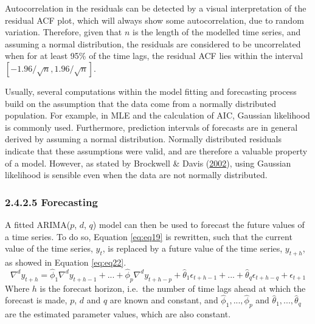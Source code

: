 \documentclass[12pt,oneside]{reedthesis}
\begin{document}
Autocorrelation in the residuals can be detected by a visual
interpretation of the residual ACF plot, which will always show some
autocorrelation, due to random variation. Therefore, given that \(n\) is
the length of the modelled time series, and assuming a normal
distribution, the residuals are considered to be uncorrelated when for
at least 95\% of the time lags, the residual ACF lies within the
interval \([-1.96/\sqrt{n}, 1.96/\sqrt{n}]\).

Usually, several computations within the model fitting and forecasting
process build on the assumption that the data come from a normally
distributed population. For example, in MLE and the calculation of AIC,
Gaussian likelihood is commonly used. Furthermore, prediction intervals
of forecasts are in general derived by assuming a normal distribution.
Normally distributed residuals indicate that these assumptions were
valid, and are therefore a valuable property of a model. However, as
stated by Brockwell \& Davis
(\protect\hyperlink{ref-brockwell2002}{2002}), using Gaussian likelihood
is sensible even when the data are not normally distributed.

\subsubsection{2.4.2.5 Forecasting}\label{forecasting}

A fitted ARIMA(\(p\), \(d\), \(q\)) model can then be used to forecast
the future values of a time series. To do so, Equation \eqref{eq:eq19} is
rewritten, such that the current value of the time series, \(y_{t}\), is
replaced by a future value of the time series, \(y_{t+h}\), as showed in
Equation \eqref{eq:eq22}.
\begin{equation}
\nabla^{d}y_{t+h} = \hat\phi_{1}\nabla^{d}y_{t+h-1} + ... + \hat\phi_{p}\nabla^{d}y_{t+h-p} +\hat\theta_{1}\epsilon_{t+h-1} + ... + \hat\theta_{q}\epsilon_{t+h-q} + \epsilon_{t+1}
\label{eq:eq22}
\end{equation}
Where \(h\) is the forecast horizon, i.e.~the number of time lags ahead
at which the forecast is made, \(p\), \(d\) and \(q\) are known and
constant, and \(\hat\phi_{1},...,\hat\phi_{p}\) and
\(\hat\theta_{1},...,\hat\theta_{q}\) are the estimated parameter
values, which are also constant.
\end{document}
